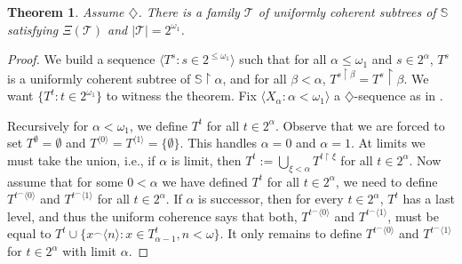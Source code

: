 \documentclass[a4paper,noamsfonts]{amsart}
\newtheorem{theorem}{Theorem}[section]
\theoremstyle{definition}
\newcommand{\es}{\emptyset}
\newcommand{\res}{\!\upharpoonright\!}
\newcommand{\tup}[1]{\langle#1\rangle}
\newcommand{\1}{\mathbbm{1}}
\newcommand{\dia}{\diamondsuit}
\newcommand{\T}{\mathcal{T}}
\newcommand{\prop}{\Xi}
\renewcommand{\S}{\mathbb{S}}
\begin{document}
\begin{theorem}\label{thm:existence}
  Assume $\dia$. There is a family $\T$ of uniformly coherent
  subtrees of $\S$ satisfying $\prop(\T)$ and $|\T| = 2^{\omega_{1}}$.
\end{theorem}
\begin{proof}
  We build a sequence $\tup{T^{s} : s \in 2^{\le\omega_{1}}}$
  such that for all $\alpha \le \omega_{1}$ and $s \in 2^{\alpha}$,
  $T^{s}$ is a uniformly coherent subtree of $\S \res \alpha$,
  and for all $\beta < \alpha$, $T^{s\res\beta} = T^{s}\res\beta$.
  We want $\{T^{t} : t \in 2^{\omega_{1}}\}$ to witness the theorem.
  Fix $\tup{X_{\alpha} : \alpha < \omega_{1}}$
  a $\dia$-sequence as in .

  Recursively for $\alpha < \omega_{1}$, we define
  $T^{t}$ for all $t \in 2^{\alpha}$. Observe that we are forced
  to set $T^{\es} = \es$ and $T^{\tup{0}} = T^{\tup{1}} = \{\es\}$. This handles
  $\alpha = 0$ and $\alpha = 1$. At
  limits we must take the union, i.e., if $\alpha$ is limit, then
  $T^{t} := \bigcup_{\xi < \alpha}T^{t\res \xi}$ for all $t \in 2^{\alpha}$.
  Now assume that for some $0 < \alpha$
  we have defined $T^{t}$ for all $t \in 2^{\alpha}$, we need to define
  $T^{t^{\frown}\tup{0}}$ and $T^{t^{\frown}\tup{1}}$ for all $t \in 2^{\alpha}$.
  If $\alpha$ is successor, then for every $t \in 2^{\alpha}$,
  $T^{t}$ has a last level, and thus the uniform coherence
  says that both, $T^{t^{\frown}\tup{0}}$ and $T^{t^{\frown}\tup{1}}$,
  must be equal to $T^{t} \cup
  \{x^{\frown}\tup{n} : x \in T^{t}_{\alpha-1}, n < \omega\}$.
  It only remains to define
  $T^{t^{\frown}\tup{0}}$ and $T^{t^{\frown}\tup{1}}$
  for $t \in 2^{\alpha}$ with limit $\alpha$.


\end{proof}
\end{document}
